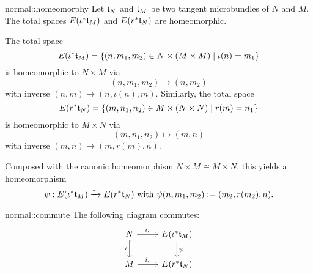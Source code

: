 \begin{mylemma}{normal::homeomorphy}
    Let $\mathfrak{t}_N$ and $\mathfrak{t}_M$ be two tangent microbundles of $N$ and $M$.
    The total spaces $E(\iota^*\mathfrak{t}_M)$ and $E(r^*\mathfrak{t}_N)$ are homeomorphic.
\end{mylemma}

\begin{myproof}
    The total space
    \[ E(\iota^*\mathfrak{t}_M) = \{ (n, m_1, m_2) \in N \times (M \times M) \mid \iota(n) = m_1\} \]
    is homeomorphic to $N \times M$ via
    \[ (n, m_1, m_2) \mapsto (n, m_2) \]
    with inverse $(n, m) \mapsto (n, \iota(n), m)$.
    Similarly, the total space
    \[ E(r^*\mathfrak{t}_N) = \{ (m, n_1, n_2) \in M \times (N \times N) \mid r(m) = n_1\} \]
    is homeomorphic to $M \times N$ via
    \[ (m, n_1, n_2) \mapsto (m, n) \]
    with inverse $(m, n) \mapsto (m, r(m), n)$.
    
    Composed with the canonic homeomorphism $N \times M \cong M \times N$, this yields a homeomorphism
    \[ \psi: E(\iota^*\mathfrak{t}_M) \xrightarrow{\sim} E(r^*\mathfrak{t}_N) \text{ with } \psi(n, m_1, m_2) := (m_2, r(m_2), n). \]
\end{myproof}

\begin{myremark}{normal::commute}
    The following diagram commutes:
    \[
        \begin{tikzcd}
            N \ar[r, "i_\iota"] \ar[hookrightarrow, "\iota"']{d} & E(\ind{\iota}\bt_M) \ar[d, "\psi"] \\
            M \ar[r, "i_r"] & E(\ind{r}\bt_N)
        \end{tikzcd}
    \]
\end{myremark}